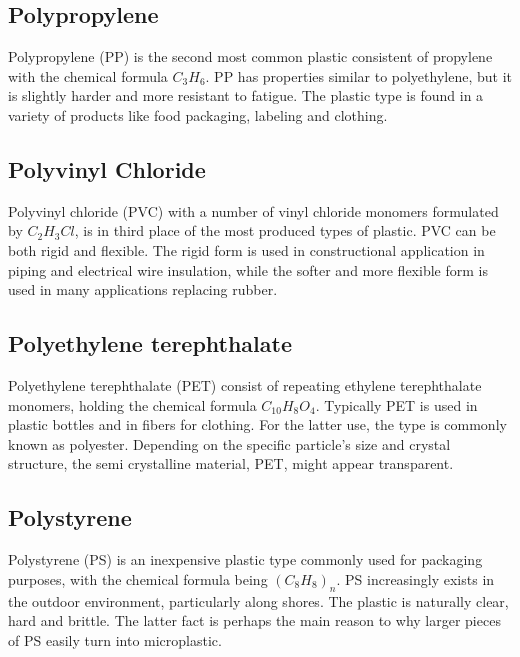 \subsection{Polypropylene}
Polypropylene (PP) is the second most common plastic consistent of propylene with the chemical formula $C_3H_6$. PP has properties similar to polyethylene, but it is slightly harder and more resistant to fatigue. The plastic type is found in a variety of products like food packaging, labeling and clothing. 

\subsection{Polyvinyl Chloride}
Polyvinyl chloride (PVC) with a number of vinyl chloride monomers formulated by $C_2H_3Cl$, is in third place of the most produced types of plastic. PVC can be both rigid and flexible. The rigid form is used in constructional application in piping and electrical wire insulation, while the softer and more flexible form is used in many applications replacing rubber. 

\subsection{Polyethylene terephthalate}
Polyethylene terephthalate (PET) consist of repeating ethylene terephthalate monomers, holding the chemical formula $C_{10}H_8O_4$. Typically PET is used in plastic bottles and in fibers for clothing. For the latter use, the type is commonly known as polyester. Depending on the specific particle's size and crystal structure, the semi crystalline material, PET, might appear transparent. 

\subsection{Polystyrene}
Polystyrene (PS) is an inexpensive plastic type commonly used for packaging purposes, with the chemical formula being $(C_8H_8)_n$. PS increasingly exists in the outdoor environment, particularly along shores. The plastic is naturally clear, hard and brittle. The latter fact is perhaps the main reason to why larger pieces of PS easily turn into microplastic. 

